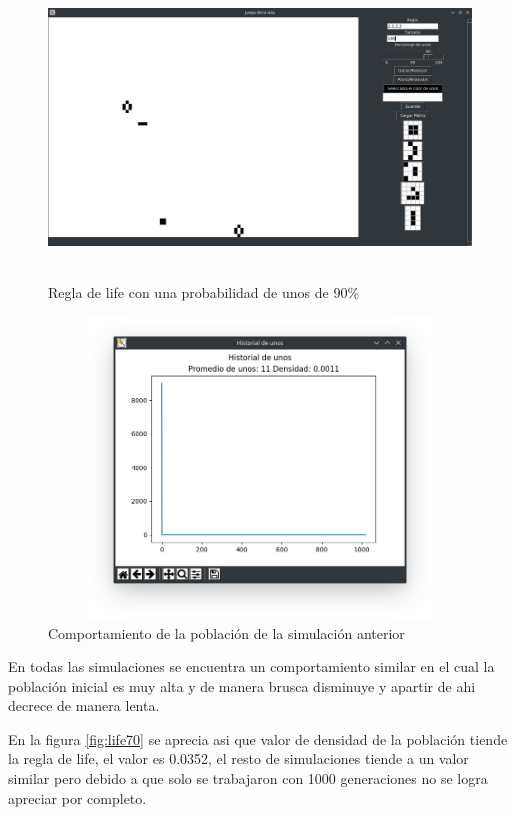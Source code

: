 \begin{figure}[H]
\begin{center}
 \includegraphics[width=12cm, height=8cm]{./img/life80.png}
 \caption{Regla de life con una probabilidad de unos de 90\%}
 \label{fig:life90}
\end{center}
\end{figure}

\begin{figure}[H]
\begin{center}
 \includegraphics[width=12cm, height=8cm]{./img/life90grafica.png}
 \caption{Comportamiento de la población de la simulación anterior}
 \label{fig:life90grafica}
\end{center}
\end{figure}

\newpage
En todas las simulaciones se encuentra un comportamiento similar en el cual la población inicial es muy alta y de manera brusca disminuye y apartir de ahi decrece de manera lenta.

En la figura \ref{fig:life70} se aprecia asi que valor de densidad de la población tiende la regla de life, el valor es 0.0352, el resto de simulaciones tiende a un valor similar pero debido a que solo se trabajaron con 1000 generaciones no se logra apreciar por completo.

